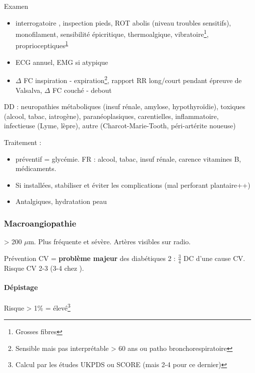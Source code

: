 \documentclass{book}
\begin{document}
Examen 
\begin{itemize}
\item interrogatoire , inspection pieds, ROT abolis (niveau troubles sensitifs), monofilament, sensibilité épicritique, thermoalgique, vibratoire\footnote{Grosses fibres\label{org6f541c1}}, proprioceptiques\textsuperscript{\ref{org6f541c1}}
\item ECG annuel, EMG si atypique
\item \(\Delta\) FC inspiration - expiration\footnote{Sensible mais pas interprétable > 60 ans ou patho bronchorespiratoire}, rapport RR long/court pendant épreuve de
Valsalva, \(\Delta\) FC couché - debout
\end{itemize}

DD : neuropathies métaboliques (insuf rénale, amylose, hypothyroïdie), toxiques
(alcool, tabac, iatrogène), paranéoplasiques, carentielles, inflammatoire,
infectieuse (Lyme, lèpre), autre (Charcot-Marie-Tooth, péri-artérite noueuse)

Traitement : 
\begin{itemize}
\item préventif = glycémie. FR : alcool, tabac, insuf rénale, carence vitamines B, médicaments.
\item Si installées, stabiliser et éviter les complications (mal perforant plantaire++)
\item Antalgiques, hydratation peau
\end{itemize}

\subsubsection{Macroangiopathie}
\label{sec:org909042a}
\diameter > 200 \(\mu\)m. Plus fréquente et sévère. Artères visibles sur radio.

Prévention CV = \textbf{problème majeur} des diabétiques 2 : \(\frac{3}{4}\) DC d'une cause
CV. Risque CV \texttimes{}2-3 (\texttimes{}3-4 chez \female). 

\paragraph{Dépistage}
\label{sec:org32f6aac}
Risque > 1\% = élevé\footnote{Calcul par les études UKPDS ou SCORE (mais \texttimes{}2-4 pour ce dernier)}
\end{document}
